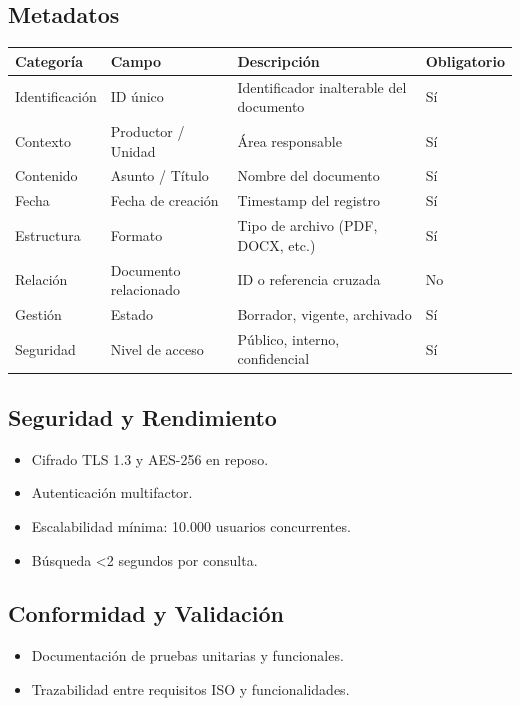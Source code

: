 \documentclass[12pt,a4paper]{article}
\begin{document}
\subsection{Metadatos}
\begin{longtable}{p{3cm}p{5cm}p{4cm}p{3cm}}
\toprule
\textbf{Categoría} & \textbf{Campo} & \textbf{Descripción} & \textbf{Obligatorio} \\
\midrule
Identificación & ID único & Identificador inalterable del documento & Sí \\
Contexto & Productor / Unidad & Área responsable & Sí \\
Contenido & Asunto / Título & Nombre del documento & Sí \\
Fecha & Fecha de creación & Timestamp del registro & Sí \\
Estructura & Formato & Tipo de archivo (PDF, DOCX, etc.) & Sí \\
Relación & Documento relacionado & ID o referencia cruzada & No \\
Gestión & Estado & Borrador, vigente, archivado & Sí \\
Seguridad & Nivel de acceso & Público, interno, confidencial & Sí \\
\bottomrule
\end{longtable}

\subsection{Seguridad y Rendimiento}
\begin{itemize}
    \item Cifrado TLS 1.3 y AES-256 en reposo.
    \item Autenticación multifactor.
    \item Escalabilidad mínima: 10.000 usuarios concurrentes.
    \item Búsqueda <2 segundos por consulta.
\end{itemize}

\subsection{Conformidad y Validación}
\begin{itemize}
    \item Documentación de pruebas unitarias y funcionales.
    \item Trazabilidad entre requisitos ISO y funcionalidades.
\end{itemize}

\end{document}
